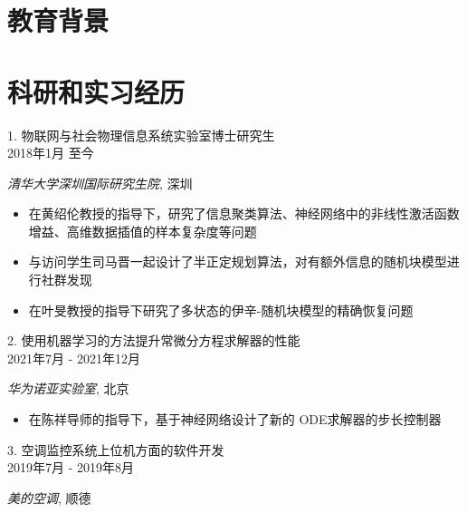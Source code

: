 \documentclass[12pt,colorlinks,linkcolor=true]{moderncv}
\begin{document}
\makecvtitle
\section{教育背景}
\section{科研和实习经历}

{\raggedright\large 1. 物联网与社会物理信息系统实验室博士研究生\\
\raggedleft\small \textsc{2018年1月 至今}\par\textit{清华大学深圳国际研究生院}, 深圳 \\[5pt]}

\normalsize{\begin{itemize}
		\item 在黄绍伦教授的指导下，研究了信息聚类算法、神经网络中的非线性激活函数增益、高维数据插值的样本复杂度等问题
		\item 与访问学生司马晋一起设计了半正定规划算法，对有额外信息的随机块模型进行社群发现
		\item 在叶旻教授的指导下研究了多状态的伊辛-随机块模型的精确恢复问题
\end{itemize}}

{\raggedright\large 2. 使用机器学习的方法提升常微分方程求解器的性能\\
\raggedleft\small \textsc{2021年7月 - 2021年12月}\par \textit{华为诺亚实验室}, 北京 \\[5pt]}

\normalsize{\begin{itemize}
		\item 在陈祥导师的指导下，基于神经网络设计了新的 ODE求解器的步长控制器
\end{itemize}}




{\raggedright\large 3. 空调监控系统上位机方面的软件开发 \\
\raggedleft\small \textsc{2019年7月 - 2019年8月}\par\textit{美的空调}, 顺德\\[5pt]}
\end{document}
